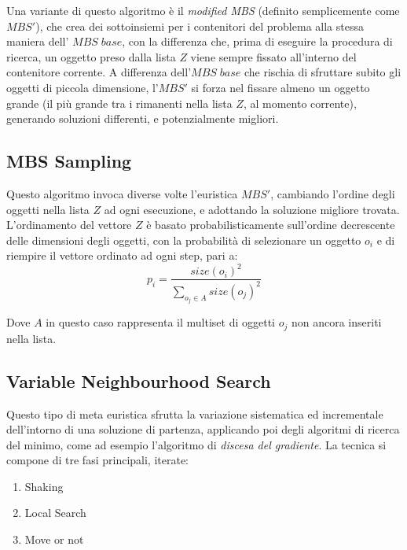 \documentclass{article}
\begin{document}
\newline
\newline
Una variante di questo algoritmo è il \textit{modified MBS} (definito semplicemente come $MBS'$), che crea dei sottoinsiemi per i contenitori del problema alla stessa maniera dell' $MBS\;base$, con la differenza che, prima di eseguire la procedura di ricerca, un oggetto preso dalla lista $Z$ viene sempre fissato all'interno del contenitore corrente.
\newline
\newline
A differenza dell'$MBS\;base$ che rischia di sfruttare subito gli oggetti di piccola dimensione, l'$MBS'$ si forza nel fissare almeno un oggetto grande (il più grande tra i rimanenti nella lista $Z$, al momento corrente), generando soluzioni differenti, e potenzialmente migliori.
 
\subsection{MBS Sampling}
Questo algoritmo invoca diverse volte l'euristica $MBS'$, cambiando l'ordine degli oggetti nella lista $Z$ ad ogni esecuzione, e adottando la soluzione migliore trovata.
\newline
\newline
L'ordinamento del vettore $Z$ è basato probabilisticamente sull'ordine decrescente delle dimensioni degli oggetti, con la probabilità di selezionare un oggetto $o_i$ e di riempire il vettore ordinato ad ogni step, pari a:
\[
p_i = \frac{size(o_i)^{2}}{\sum_{o_{j} \in A }size(o_{j})^{2}}
\]

Dove $A$ in questo caso rappresenta il multiset di oggetti $o_j$ non ancora inseriti nella lista.

\subsection{Variable Neighbourhood Search}

Questo tipo di meta euristica sfrutta la variazione sistematica ed incrementale dell'intorno di una soluzione di partenza, applicando poi degli algoritmi di ricerca del minimo, come ad esempio l'algoritmo di \textit{discesa del gradiente}.
\newline
\newline
La tecnica si compone di tre fasi principali, iterate:
\begin{enumerate}
\item Shaking
\item Local Search
\item Move or not
\end{enumerate}
\end{document}
